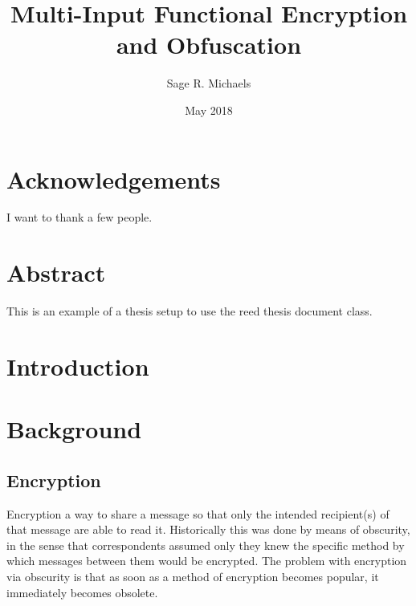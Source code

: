\documentclass[12pt,twoside]{reedthesis}
\title{Multi-Input Functional Encryption and Obfuscation}
\author{Sage R. Michaels}
\date{May 2018}
\begin{document}
  \maketitle
  \frontmatter %
  \pagestyle{empty} %

    \chapter*{Acknowledgements}
	I want to thank a few people.

    \chapter*{Abstract}
	This is an example of a thesis setup to use the reed thesis document class.
	

    \tableofcontents
    
 
  \mainmatter %
  \pagestyle{fancyplain} %
    
     \chapter*{Introduction}
	        
    
    \chapter{Background}
    \section{Encryption}
    Encryption a way to share a message so that only the intended recipient(s) of
    that message are able to read it. Historically this was done by means of obscurity, in the sense that correspondents assumed only they knew the specific method by which messages between them would be encrypted. The problem with encryption via obscurity is that as soon as a method of encryption becomes popular, it immediately becomes obsolete.
\end{document}
